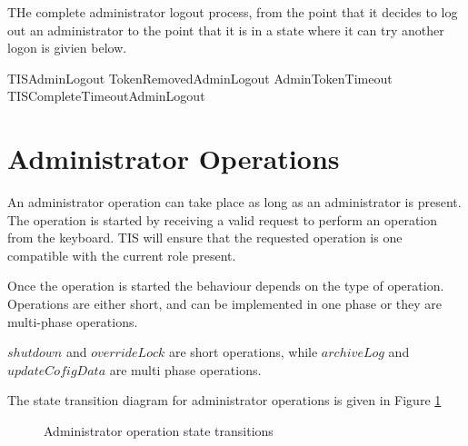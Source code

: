 THe complete administrator logout process, from the point that it
decides to log out an administrator to the point that it is in a state
where it can try another logon is givien below.

\begin{zed}
TISAdminLogout   TokenRemovedAdminLogout \lor AdminTokenTimeout \lor TISCompleteTimeoutAdminLogout 
\end{zed}

\section{Administrator Operations}
An administrator operation can take place as long as an administrator
is present. The operation is started by receiving a valid request to
perform an operation from the keyboard. TIS will ensure that the
requested operation is one compatible with the current role present.

Once the operation is started the behaviour depends on the type of
operation. Operations are either short, and can be implemented in one
phase or they are multi-phase operations. 

$shutdown$ and $overrideLock$ are short operations, while $archiveLog$
and $updateCofigData$ are multi phase operations.

The state transition diagram for administrator operations is given in
Figure \ref{fig:adminOp}

\begin{figure}[htbp]
  \begin{center}
    \leavevmode
    \caption{Administrator operation state transitions}
    \label{fig:adminOp}
  \end{center}
\end{figure}

